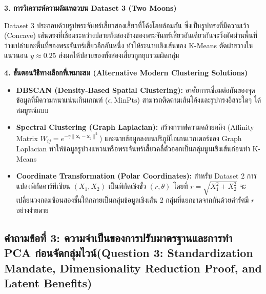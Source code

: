 \documentclass[12pt,a4paper]{article}
\begin{document}
\begin{ansbox}[unbreakable, fontupper={\fontsize{9.6pt}{12.6pt}\selectfont}, left=6pt, right=6pt, top=3pt, bottom=3pt]
\vspace{0.15em}
\noindent\textbf{\normalsize 3. การวิเคราะห์ความล้มเหลวบน Dataset 3 (Two Moons)}\par\vspace{0.05em}
Dataset 3 ประกอบด้วยรูปพระจันทร์เสี้ยวสองเสี้ยวที่โค้งโอบล้อมกัน ซึ่งเป็นรูปทรงที่มีความเว้า (Concave) เส้นตรงที่เชื่อมระหว่างปลายทั้งสองข้างของพระจันทร์เสี้ยวอันเดียวกันจะวิ่งตัดผ่านพื้นที่ว่างเปล่าและพื้นที่ของพระจันทร์เสี้ยวอีกอันหนึ่ง ทำให้ระนาบเชิงเส้นของ K-Means ตัดผ่าขวางในแนวนอน $y \approx 0.25$ ส่งผลให้ปลายของทั้งสองเสี้ยวถูกยุบรวมผิดกลุ่ม

\vspace{0.15em}
\noindent\textbf{\normalsize 4. ขั้นตอนวิธีทางเลือกที่เหมาะสม (Alternative Modern Clustering Solutions)}\par\vspace{0.05em}
\begin{itemize}[leftmargin=1.2em, itemsep=0.5pt, topsep=0.5pt]
    \item \textbf{DBSCAN (Density-Based Spatial Clustering):} อาศัยการเชื่อมต่อกันของจุดข้อมูลที่มีความหนาแน่นเกินเกณฑ์ ($\epsilon, \text{MinPts}$) สามารถติดตามเส้นโค้งและรูปทรงอิสระใดๆ ได้สมบูรณ์แบบ
    \item \textbf{Spectral Clustering (Graph Laplacian):} สร้างกราฟความคล้ายคลึง (Affinity Matrix $W_{ij} = e^{-\gamma \|\mathbf{x}_i - \mathbf{x}_j\|^2}$) และฉายข้อมูลลงบนปริภูมิไอเกนเวกเตอร์ของ Graph Laplacian ทำให้ข้อมูลรูปวงแหวนหรือพระจันทร์เสี้ยวคลี่ตัวออกเป็นกลุ่มนูนเชิงเส้นก่อนทำ K-Means
    \item \textbf{Coordinate Transformation (Polar Coordinates):} สำหรับ Dataset 2 การแปลงพิกัดคาร์ทีเซียน $(X_1, X_2)$ เป็นพิกัดเชิงขั้ว $(r, \theta)$ โดยที่ $r = \sqrt{X_1^2 + X_2^2}$ จะเปลี่ยนวงกลมซ้อนสองชั้นให้กลายเป็นกลุ่มข้อมูลเชิงเส้น 2 กลุ่มที่แยกขาดจากกันด้วยค่ารัศมี $r$ อย่างง่ายดาย
\end{itemize}
\end{ansbox}

\clearpage
\subsection*{คำถามข้อที่ 3: ความจำเป็นของการปรับมาตรฐานและการทำ PCA ก่อนจัดกลุ่มไวน์\newline \normalsize(Question 3: Standardization Mandate, Dimensionality Reduction Proof, and Latent Benefits)}
\vspace{-0.5em}
\end{document}
